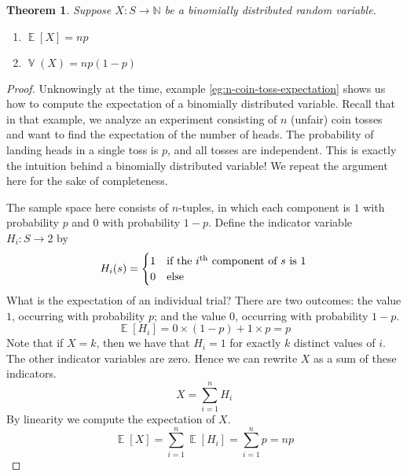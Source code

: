 \documentclass[11pt,letterpaper]{article}
\newtheorem{thm}{Theorem}
\theoremstyle{definition}
\theoremstyle{remark}
\newcommand{\parens}[1]{\left(#1\right)}
\newcommand{\N}{\mathbb{N}}
\DeclareMathOperator{\Expect}{\mathbb{E}}
\newcommand{\E}[1]{\Expect{\left[#1\right]}}
\DeclareMathOperator{\Var}{\mathbb{V}}
\newcommand{\V}[1]{\Var{\parens{#1}}}
\renewcommand{\th}{\textsuperscript{th}}
\begin{document}
\begin{thm}
    \label{thm:e-v-of-binomial-distribution}
    Suppose $X : S \to \N$ be a binomially distributed random variable.
    \begin{enumerate}
        \item $\E{X} = np$
        \item $\V{X} = np(1-p)$
    \end{enumerate}
\end{thm}

\begin{proof}
    Unknowingly at the time, example \ref{eg:n-coin-toss-expectation} shows us
    how to compute the expectation of a binomially distributed variable.
    Recall that in that example, we analyze an experiment consisting of $n$
    (unfair) coin tosses and want to find the expectation of the number of
    heads. The probability of landing heads in a single toss is $p$, and all
    tosses are independent.
    This is exactly the intuition behind a binomially distributed variable!
    We repeat the argument here for the sake of completeness.

    The sample space here consists of $n$-tuples, in which each component is
    $1$ with probability $p$ and $0$ with probability $1-p$.
    Define the indicator variable $H_i : S \to 2$ by
    \begin{equation*}
        H_i(s) = \begin{cases}
            1 & \text{if the $i$\th{} component of $s$ is $1$} \\
            0 & \text{else}
        \end{cases}
    \end{equation*}
    What is the expectation of an individual trial? There are two outcomes: the
    value $1$, occurring with probability $p$; and the value $0$, occurring
    with probability $1-p$.
    \begin{equation*}
        \E{H_i} = 0 \times (1-p) + 1 \times p = p
    \end{equation*}
    Note that if $X = k$, then we have that $H_i = 1$ for exactly $k$ distinct
    values of $i$.
    The other indicator variables are zero.
    Hence we can rewrite $X$ as a sum of these indicators.
    \begin{equation*}
        X = \sum_{i=1}^n H_i
    \end{equation*}
    By linearity we compute the expectation of $X$.
    \begin{equation*}
        \E{X} = \sum_{i=1}^n \E{H_i} = \sum_{i=1}^n p = np
    \end{equation*}


\end{proof}
\end{document}
